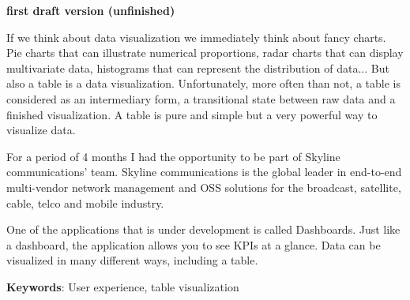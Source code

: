 \textbf{first draft version (unfinished)}

If we think about data visualization we immediately think about fancy charts. Pie charts that can illustrate numerical proportions, radar charts that can display multivariate data, histograms that can represent the distribution of data... But also a table is a data visualization. Unfortunately, more often than not, a table is considered as an intermediary form, a transitional state between raw data and a finished visualization. A table is pure and simple but a very powerful way to visualize data.  

For a period of 4 months I had the opportunity to be part of Skyline communications' team. Skyline communications is the global leader in end-to-end multi-vendor network management and OSS solutions for the broadcast, satellite, cable, telco and mobile industry. 

One of the applications that is under development is called Dashboards. Just like a dashboard, the application allows you to see KPIs at a glance. Data can be visualized in many different ways, including a table. 



\textbf{Keywords}: User experience, table visualization
